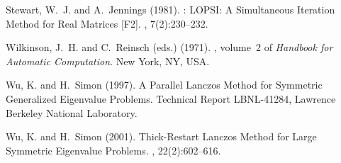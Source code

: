\documentclass[titlepage,10pt,a4paper]{slepc}
\begin{document}
\begin{thebibliography}{19}
Stewart, W.~J. and A.~Jennings (1981).
: {LOPSI}: {A} Simultaneous Iteration Method for Real
  Matrices [{F2}].
, 7(2):230--232.

Wilkinson, J.~H. and C.~Reinsch (eds.) (1971).
, volume~2 of {\em Handbook for Automatic
  Computation\/}.
\newblock New York, NY, USA.

Wu, K. and H.~Simon (1997).
\newblock A Parallel {L}anczos Method for Symmetric Generalized Eigenvalue
  Problems.
\newblock Technical Report LBNL-41284, Lawrence Berkeley National Laboratory.

Wu, K. and H.~Simon (2001).
\newblock Thick-Restart {Lanczos} Method for Large Symmetric Eigenvalue
  Problems.
,
  22(2):602--616.

\end{thebibliography}

\cleardoublepage
\fancyhead{}

\cleardoublepage
\end{document}
